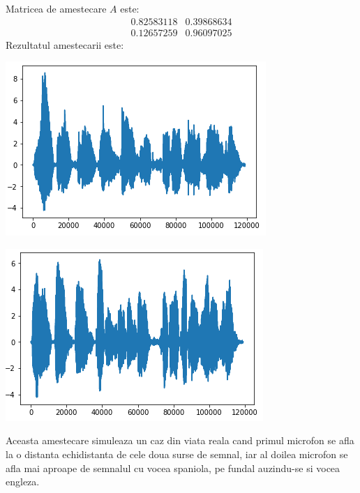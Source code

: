 \documentclass[12pt]{article}
\begin{document}
 Matricea de amestecare $A$ este: 
\[
 \begin{matrix}
	0.82583118 & 0.39868634 \\
	0.12657259 & 0.96097025
 \end{matrix}
\]
Rezultatul amestecarii este:
\begin{center}
	\includegraphics[scale=1]{speech_mixed_1}
 \end{center}
\begin{center}
	\includegraphics[scale=1]{speech_mixed_2}
 \end{center}

 Aceasta amestecare simuleaza un caz din viata reala cand primul microfon se afla la o distanta echidistanta de cele doua surse de semnal, iar al doilea microfon se afla mai aproape de semnalul cu vocea spaniola, pe fundal auzindu-se si vocea engleza.
\end{document}
